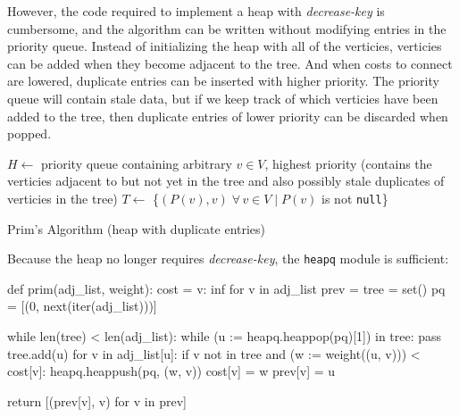 \documentclass[12pt, titlepage]{article}
\begin{document}
However, the code required to implement a heap with \textit{decrease-key} is cumbersome, and the algorithm can be written without modifying entries in the priority queue. Instead of initializing the heap with all of the verticies, verticies can be added when they become adjacent to the tree. And when costs to connect are lowered, duplicate entries can be inserted with higher priority. The priority queue will contain stale data, but if we keep track of which verticies have been added to the tree, then duplicate entries of lower priority can be discarded when popped. \\

\begin{algorithm}[H]
  \SetAlgoLined
  \DontPrintSemicolon
  $H \longleftarrow$\hspace{0.5mm} priority queue containing arbitrary $v\in V$, highest priority\;
  \hspace{13mm}(contains the verticies adjacent to but not yet in the tree and\;
  \hspace{13mm}also possibly stale duplicates of verticies in the tree)\;
  $T \longleftarrow$\hspace{0.5mm} \{$(P(v), v)\;\forall\,v\in V\mid P(v)$ is not \texttt{null}\}\;
  \;
    \caption{Prim's Algorithm (heap with duplicate entries)}
\end{algorithm} \medskip

Because the heap no longer requires \textit{decrease-key}, the \texttt{heapq} module is sufficient: \medskip

\begin{python}
def prim(adj_list, weight):
    cost = {v: inf for v in adj_list}
    prev = {}
    tree = set()
    pq = [(0, next(iter(adj_list)))]

    while len(tree) < len(adj_list):
        while (u := heapq.heappop(pq)[1]) in tree: pass
        tree.add(u)
        for v in adj_list[u]:
            if v not in tree and (w := weight((u, v))) < cost[v]:
                heapq.heappush(pq, (w, v))
                cost[v] = w
                prev[v] = u
        
    return [(prev[v], v) for v in prev]
\end{python}
\end{document}
